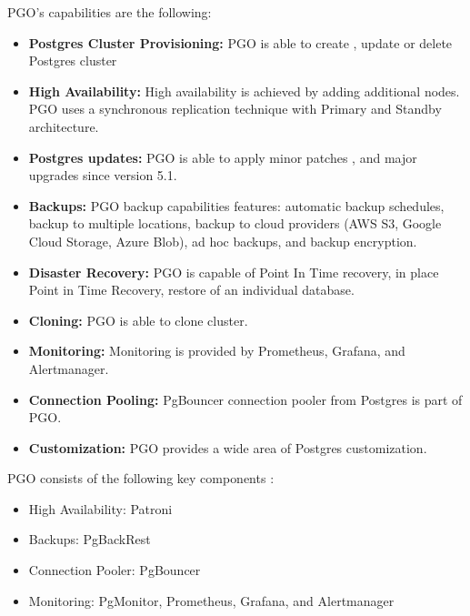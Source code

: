 PGO’s capabilities are the following:
\begin{itemize}
    \item \textbf{Postgres Cluster Provisioning:} PGO is able to create \cite{CrunchyDocCreate}, update \cite{CrunchyDocUpdate} or delete Postgres cluster \cite{CrunchyDocDelete}
    \item \textbf{High Availability:} High availability is achieved by adding additional nodes. PGO uses a synchronous replication technique with Primary and Standby architecture. \cite{CrunchyDocHA}
    \item \textbf{Postgres updates:} PGO is able to apply minor patches \cite{CrunchyDocMinorUpdates}, and major upgrades since version 5.1. \cite{CrunchyBlogUpdates}
    \item \textbf{Backups:} PGO backup capabilities features: automatic backup schedules, backup to multiple locations, backup to cloud providers (AWS S3, Google Cloud Storage, Azure Blob), ad hoc backups, and backup encryption. \cite{CrunchyDocBackups}
    \item \textbf{Disaster Recovery:} PGO is capable of Point In Time recovery, in place Point in Time Recovery, restore of an individual database. \cite{CrunchyDocDisasterRecovery}
    \item \textbf{Cloning:} PGO is able to clone cluster. \cite{CrunchyDocDisasterRecovery}
    \item \textbf{Monitoring:} Monitoring is provided by Prometheus, Grafana, and Alertmanager. \cite{CrunchyDocMonitoring}
    \item \textbf{Connection Pooling:} PgBouncer connection pooler from Postgres is part of PGO. \cite{CrunchyDocConnectionPooling}
    \item  \textbf{Customization:} PGO provides a wide area of Postgres customization. \cite{CrunchyDocCustomisation}
\end{itemize}


PGO consists of the following key components \cite{CrunchyPGOGit}:
\begin{itemize}
    \item High Availability: Patroni
    \item Backups: PgBackRest
    \item Connection Pooler: PgBouncer
    \item Monitoring: PgMonitor, Prometheus, Grafana, and Alertmanager
\end{itemize}


